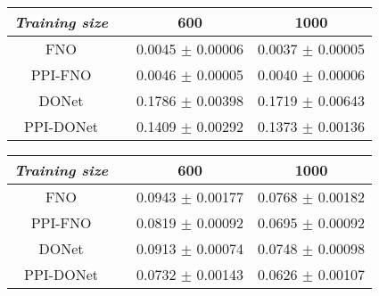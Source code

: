 \begin{table*}[h]
    \begin{subtable}{\textwidth}
    \caption{\small \textit{Poisson}}
    \label{tab:poisson}
    \small 
    \centering
    \begin{tabular}{cccc}
        \hline
        \textit{Training size}      &  & {600}             & {1000}            \\ \hline
        FNO                  &  & 0.0045 $\pm$ 0.00006	& 0.0037 $\pm$ 0.00005     \\
        PPI-FNO          &  & {0.0046} $\pm$ {0.00005}          & {0.0040} $\pm$ {0.00006}      \\ \hline
        DONet             &  & 0.1786 $\pm$ 0.00398         & 0.1719 $\pm$ 0.00643      \\
        PPI-DONet             &  & 0.1409 $\pm$ 0.00292        & 0.1373 $\pm$ 0.00136     \\ \hline
    \end{tabular}
    \end{subtable}
    \begin{subtable}{\textwidth}
    \caption{\small \textit{Advection}}
    \label{tab:advection}
        \small 
        \centering
    \begin{tabular}{cccc}
        \hline
        \textit{Training size}      &  & {600}             & {1000}         \\ \hline
        FNO                  &  & 0.0943 $\pm$ 0.00177	& 0.0768 $\pm$ 0.00182    \\
        PPI-FNO          &  & {0.0819} $\pm$ {0.00092}          & {0.0695} $\pm$ {0.00092}    \\ \hline
        DONet             &  & 0.0913 $\pm$ 0.00074         & 0.0748 $\pm$ 0.00098        \\
        PPI-DONet             &  & 0.0732 $\pm$ 0.00143       & 0.0626 $\pm$ 0.00107     \\ \hline
    \end{tabular}
    \end{subtable}
    
\end{table*}


